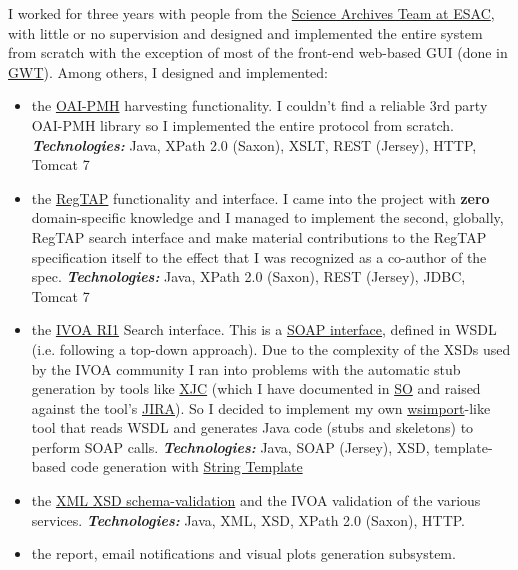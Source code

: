 \documentclass[helvetica,english,logo,notitle,totpages,utf8]{europecv2013}
\newcommand{\technologies}[0]{\textbf{\textit{Technologies:}}}
\begin{document}
\begin{europecv}
{  I worked for three years with people from the \href{http://www.sciops.esa.int/index.php?project=SAT}{Science
    Archives Team at ESAC}, with little or no supervision
  and designed and implemented the entire system from scratch with the exception of most
  of the front-end web-based GUI (done in \href{http://www.gwtproject.org/}{GWT}).
  Among others, I designed and implemented:
  \begin{itemize}
  \item the \href{http://www.openarchives.org/pmh/}{OAI-PMH} harvesting functionality. I couldn't find a reliable 3rd party OAI-PMH library
    so I implemented the entire protocol from scratch.
    \technologies{} Java, XPath 2.0 (Saxon), XSLT, REST (Jersey), HTTP, Tomcat 7
  \item the \href{http://www.ivoa.net/documents/RegTAP/}{RegTAP} functionality and interface. I came into the project with \textbf{zero} domain-specific
    knowledge and I managed to implement the second, globally, RegTAP search interface and make material
    contributions to the RegTAP specification itself to the effect that I was recognized as a co-author of the spec.
    \technologies{} Java, XPath 2.0 (Saxon), REST (Jersey), JDBC, Tomcat 7
  \item the \href{http://www.ivoa.net/documents/RegistryInterface/20091104/REC-RegistryInterface-1.0.pdf}{IVOA RI1} Search interface. This is a \href{https://en.wikipedia.org/wiki/SOAP}{SOAP interface}, defined in WSDL (i.e. following a top-down approach). 
    Due to the complexity of the XSDs used by the IVOA community I ran into problems with the automatic stub
    generation by tools like \href{https://docs.oracle.com/javase/6/docs/technotes/tools/share/xjc.html}{XJC} (which I have documented in \href{http://stackoverflow.com/q/17265960/274677}{SO} and raised
    against the tool's \href{https://java.net/jira/browse/JAXB-965}{JIRA}). So I decided to implement
    my own \href{https://docs.oracle.com/javase/6/docs/technotes/tools/share/wsimport.html}{wsimport}-like tool that reads WSDL and generates Java code (stubs and skeletons) to perform SOAP calls.
    \technologies{} Java, SOAP (Jersey), XSD, template-based code generation with \href{http://www.stringtemplate.org/.}{String Template}
  \item the \href{https://en.wikipedia.org/wiki/XML_Schema_(W3C)}{XML XSD schema-validation}
    and the IVOA validation of the various services.
    \technologies{} Java, XML, XSD, XPath 2.0 (Saxon), HTTP.
  \item the report, email notifications and visual plots generation subsystem.

\end{itemize}}
\end{europecv}
\end{document}
